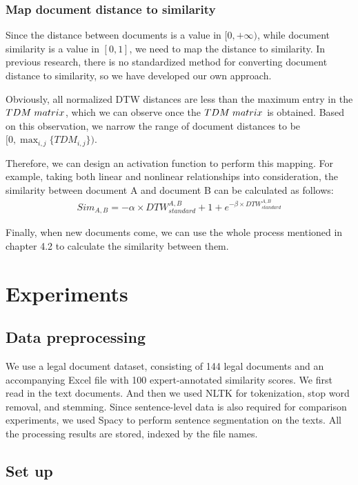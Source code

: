 \documentclass[UTF8]{ctexart}
\begin{document}
\subsubsection{Map document distance to similarity}
{
    Since the distance between documents is a value in $[0, +\infty)$, 
    while document similarity is a value in $[0, 1]$, we need to map the distance to similarity. 
    In previous research, there is no standardized method for converting document distance to similarity, 
    so we have developed our own approach.

    Obviously, all normalized DTW distances are less than the maximum entry in the $TDM \hspace{0.1cm} matrix$, 
    which we can observe once the $TDM \hspace{0.1cm} matrix$ is obtained. Based on this observation, 
    we narrow the range of document distances to be $[0, \max_{i,j} \{TDM_{i, j}\})$.

    Therefore, we can design an activation function to perform this mapping. 
    For example, taking both linear and nonlinear relationships into consideration, 
    the similarity between document A and document B can be calculated as follows:
    \begin{gather}
        Sim_{A, B} = - \alpha \times DTW_{standard}^{A, B} + 1 + e^{- \beta \times DTW_{standard}^{A, B}}
    \end{gather}

    Finally, when new documents come, we can use the whole process mentioned in chapter 4.2 to calculate 
    the similarity between them.
}
\newpage

\section{Experiments}
\subsection{Data preprocessing}
{
    We use a legal document dataset, 
    consisting of 144 legal documents and an accompanying Excel file with 100 expert-annotated similarity scores.
    We first read in the text documents.
    And then we used NLTK for tokenization, stop word removal, and stemming.
    Since sentence-level data is also required for comparison experiments, 
    we used Spacy to perform sentence segmentation on the texts. 
    All the processing results are stored, indexed by the file names.
}

\subsection{Set up}
\end{document}
